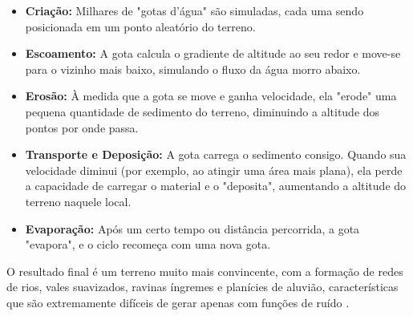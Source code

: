 \begin{itemize}
    \item \textbf{Criação:} Milhares de "gotas d'água" são simuladas, cada uma sendo posicionada em um ponto aleatório do terreno.

    \item \textbf{Escoamento:} A gota calcula o gradiente de altitude ao seu redor e move-se para o vizinho mais baixo, simulando o fluxo da água morro abaixo.

    \item \textbf{Erosão:} À medida que a gota se move e ganha velocidade, ela "erode" uma pequena quantidade de sedimento do terreno, diminuindo a altitude dos pontos por onde passa.

    \item \textbf{Transporte e Deposição:} A gota carrega o sedimento consigo. Quando sua velocidade diminui (por exemplo, ao atingir uma área mais plana), ela perde a capacidade de carregar o material e o "deposita", aumentando a altitude do terreno naquele local.

    \item \textbf{Evaporação:} Após um certo tempo ou distância percorrida, a gota "evapora", e o ciclo recomeça com uma nova gota.
\end{itemize}

O resultado final é um terreno muito mais convincente, com a formação de redes de rios, vales suavizados, ravinas íngremes e planícies de aluvião, características que são extremamente difíceis de gerar apenas com funções de ruído \cite{erosion}.
